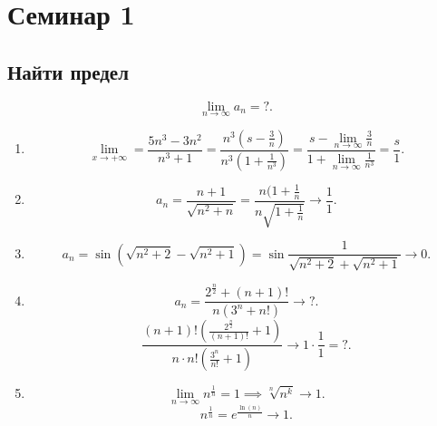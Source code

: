 \section{Семинар 1}

\subsection{Найти предел}

\begin{equation*}
    \lim_{n \to \infty} a_n = ?
.\end{equation*}

\begin{enumerate}
\item 
    \begin{equation*}
        \lim_{x \to +\infty} = \frac{5n^3 - 3n^2}{n^3 + 1} = \frac{n^3(s - \frac{3}{n})}{n^3(1 + \frac{1}{n^3})} = \frac{s - \lim_{n \to \infty} \frac{3}{n}}{1 + \lim_{n \to \infty} \frac{1}{n^3}} = \frac{s}{1}
    .\end{equation*}

\item
    \begin{equation*}
        a_n = \frac{n + 1}{\sqrt{n^2 + n}} = \frac{n(1 + \frac{1}{n}}{n\sqrt{1 + \frac{1}{n}}} \to \frac{1}{1}
    .\end{equation*}

\item
    \begin{equation*}
        a_n = \sin(\sqrt{n^2 + 2} - \sqrt{n^2 + 1}) = \sin{\frac{1}{\sqrt{n^2 + 2} + \sqrt{n^2 + 1}}} \to 0
    .\end{equation*}

\item
    \begin{equation*}
        a_n = \frac{2^{\frac{n}{2}} + (n + 1)!}{n(3^n + n!)} \to ?
    .\end{equation*}
    \begin{equation*}
        \frac{(n + 1)! (\frac{2^{\frac{n}{2}}}{(n + 1)!} + 1)}{n \cdot n! (\frac{3^n}{n!} + 1)} \to 1 \cdot \frac{1}{1} = ?
    .\end{equation*}

\item
    \begin{equation*}
        \lim_{n \to \infty} n^{\frac{1}{n}} = 1 \implies \sqrt[n]{n^k} \to 1
    .\end{equation*}
    \begin{equation*}
        n^{\frac{1}{n}} = e^{\frac{\ln(n)}{n}} \to 1
    .\end{equation*}


\end{enumerate}
